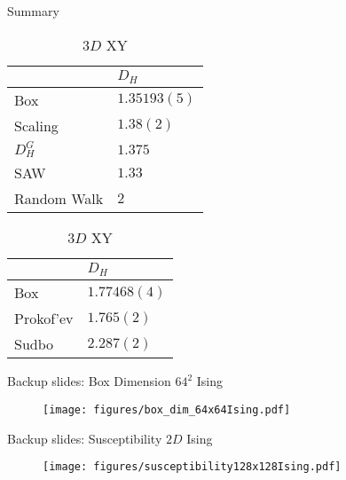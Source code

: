 \documentclass[10pt]{beamer}
\begin{document}
\begin{frame}{Summary}
    \begin{table}
        \parbox{.45\linewidth}{
            \centering
            \begin{tabular}{l|l}
                               & $D_H$          \\ \hline
                Box            & $1.35193(5)$   \\ \hline
                Scaling        & $1.38(2)$      \\ \hline
                $D_H^G$        & $1.375$        \\ \hline
                SAW            & $1.33$         \\ \hline
                Random Walk    & $2$                          
            \end{tabular}
            \caption{$2D$ Ising}
        }
        \hfill
        \parbox{.45\linewidth}{
            \centering
            \begin{tabular}{l|l}
                            & $D_H$           \\ \hline
                Box         & $1.77468(4)$    \\ \hline
                Prokof'ev   & $1.765(2)$      \\ \hline
                Sudbo       & $2.287(2)$  
            \end{tabular}
            \caption{$3D$ XY}
        }
    \end{table}
\end{frame}

\appendix

\begin{frame}[fragile]{Backup slides: Box Dimension $64^2$ Ising}
    \begin{figure}[h!]
        \centering
            \texttt{[image: figures/box\_dim\_64x64Ising.pdf]}
    \end{figure}
\end{frame}

\begin{frame}[fragile]{Backup slides: Susceptibility $2D$ Ising}
    \begin{figure}[h!]
        \centering
            \texttt{[image: figures/susceptibility128x128Ising.pdf]}
    \end{figure}
\end{frame}
\end{document}
